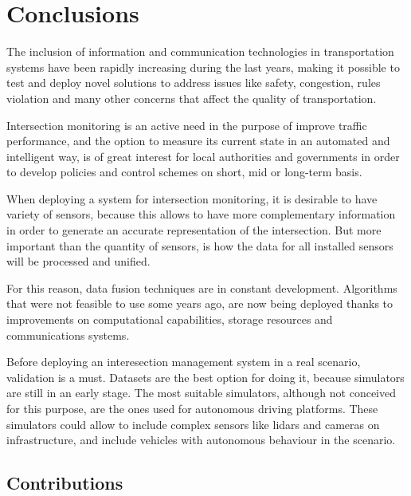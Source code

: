 \chapter {Conclusions}


The inclusion of information and communication technologies in transportation systems have been rapidly increasing during the last years, making it possible to test and deploy novel solutions to address issues like safety, congestion, rules violation and many other concerns that affect the quality of transportation.

Intersection monitoring is an active need in the purpose of improve traffic performance, and the option to measure its current state in an automated and intelligent way, is of great interest for local authorities and governments in order to develop policies and control schemes on short, mid or long-term basis.

When deploying a system for intersection monitoring, it is desirable to have variety of sensors, because this allows to have more complementary information in order to generate an accurate representation of the intersection. But more important than the quantity of sensors, is how the data for all installed sensors will be processed and unified.

For this reason, data fusion techniques are in constant development. Algorithms that were not feasible to use some years ago, are now being deployed thanks to improvements on computational capabilities, storage resources and communications systems.

Before deploying an interesection management system in a real scenario, validation is a must. Datasets are the best option for doing it, because simulators are still in an early stage. The most suitable simulators, although not conceived for this purpose, are the ones used for autonomous driving platforms. These simulators could allow to include complex sensors like lidars and cameras on infrastructure, and include vehicles with autonomous behaviour in the scenario.


\section{Contributions}

